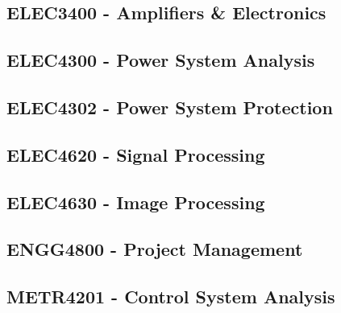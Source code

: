 \subsection{ELEC3400 - Amplifiers \& Electronics}
\clearpage

\subsection{ELEC4300 - Power System Analysis}
\clearpage

\subsection{ELEC4302 - Power System Protection}
\clearpage

\subsection{ELEC4620 - Signal Processing}
\clearpage

\subsection{ELEC4630 - Image Processing}
\clearpage

\subsection{ENGG4800 - Project Management}
\clearpage

\subsection{METR4201 - Control System Analysis}
\clearpage





